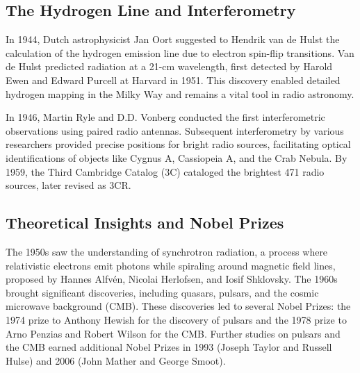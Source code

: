 \subsection{The Hydrogen Line and Interferometry}

In 1944, Dutch astrophysicist Jan Oort suggested to Hendrik van de Hulst the calculation of the hydrogen emission line due to electron spin-flip transitions. Van de Hulst predicted radiation at a 21-cm wavelength, first detected by Harold Ewen and Edward Purcell at Harvard in 1951. This discovery enabled detailed hydrogen mapping in the Milky Way and remains a vital tool in radio astronomy.

In 1946, Martin Ryle and D.D. Vonberg conducted the first interferometric observations using paired radio antennas. Subsequent interferometry by various researchers provided precise positions for bright radio sources, facilitating optical identifications of objects like Cygnus A, Cassiopeia A, and the Crab Nebula. By 1959, the Third Cambridge Catalog (3C) cataloged the brightest 471 radio sources, later revised as 3CR.

\subsection{Theoretical Insights and Nobel Prizes}

The 1950s saw the understanding of synchrotron radiation, a process where relativistic electrons emit photons while spiraling around magnetic field lines, proposed by Hannes Alfvén, Nicolai Herlofsen, and Iosif Shklovsky. The 1960s brought significant discoveries, including quasars, pulsars, and the cosmic microwave background (CMB). These discoveries led to several Nobel Prizes: the 1974 prize to Anthony Hewish for the discovery of pulsars and the 1978 prize to Arno Penzias and Robert Wilson for the CMB. Further studies on pulsars and the CMB earned additional Nobel Prizes in 1993 (Joseph Taylor and Russell Hulse) and 2006 (John Mather and George Smoot).